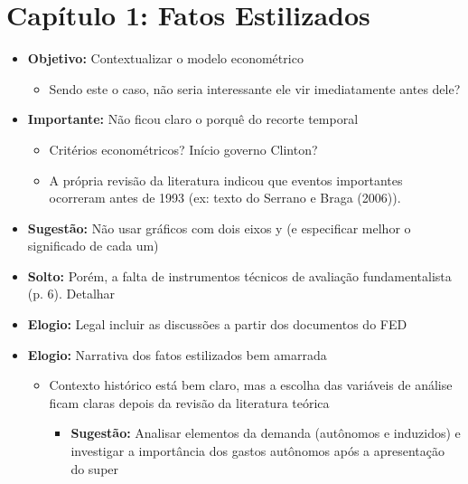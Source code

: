 \documentclass[11pt]{article}
\begin{document}
\section{Capítulo 1: Fatos Estilizados}
\label{sec:org8fd0e3d}

\begin{itemize}
\item \textbf{Objetivo:} Contextualizar o modelo econométrico
\begin{itemize}
\item Sendo este o caso, não seria interessante ele vir imediatamente antes dele?
\end{itemize}
\item \textbf{Importante:} Não ficou claro o porquê do recorte temporal
\begin{itemize}
\item Critérios econométricos? Início governo Clinton?
\item A própria revisão da literatura indicou que eventos importantes ocorreram antes de 1993 (ex: texto do Serrano e Braga (2006)).
\end{itemize}
\item \textbf{Sugestão:} Não usar gráficos com dois eixos y (e especificar melhor o significado de cada um)
\item \textbf{Solto:} Porém, a falta de instrumentos técnicos de avaliação fundamentalista (p. 6). Detalhar
\item \textbf{Elogio:} Legal incluir as discussões a partir dos documentos do FED
\item \textbf{Elogio:} Narrativa dos fatos estilizados bem amarrada
\begin{itemize}
\item Contexto histórico está bem claro, mas a escolha das variáveis de análise ficam claras depois da revisão da literatura teórica
\begin{itemize}
\item \textbf{Sugestão:} Analisar elementos da demanda (autônomos e induzidos) e investigar a importância dos gastos autônomos após a apresentação do super
\end{itemize}
\end{itemize}
\end{itemize}
\end{document}
